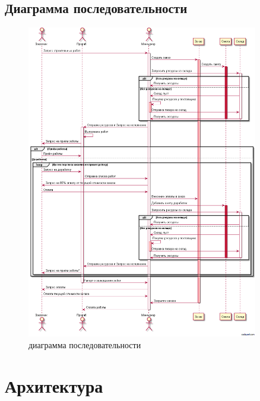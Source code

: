 \subsection{Диаграмма последовательности}
\begin{figure}[!ht]
	\centering
	\includegraphics[width=0.9\textwidth]{img/getimage.png}
	\caption{диаграмма последовательности}
\end{figure}
\newpage
\section{Архитектура}
